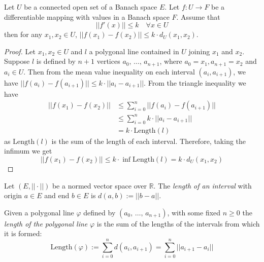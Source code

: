 \begin{theorem}
    \label{thm:mean_value_theorem_in_connected_open_set}
    \leanok
    Let $U$ be a connected open set of a Banach space $E$.
    Let $f: U \rightarrow F$ be a differentiable mapping with values in a Banach space $F$.
    Assume that
    \[
        ||f'(x)|| \leq k \quad \forall x \in U
    \]
    then for any $x_1,x_2 \in U$, $||f(x_1)-f(x_2)|| \leq k \cdot d_U(x_1,x_2)$.
\end{theorem}
\begin{proof}
    \leanok
    Let $x_1,x_2 \in U$ and $l$ a polygonal line contained in $U$ joining $x_1$ and $x_2$.
    Suppose $l$ is defined by $n + 1$ vertices $a_0,\, \dots,\, a_{n+1}$,
    where $a_0=x_1, a_{n+1} = x_2$ and $a_i \in U$.
    Then from the mean value inequality on each interval $(a_i, a_{i+1})$, we have $||f(a_i)-f(a_{i+1})|| \leq k \cdot ||a_i-a_{i+1}||$.
    From the triangle inequality we have
    \begin{align*}
        ||f(x_1)-f(x_2)|| &\leq \sum_{i=0}^{n} ||f(a_i)-f(a_{i+1})|| \\
        &\leq \sum_{i=0}^{n} k \cdot ||a_i-a_{i+1}||\\
        &= k \cdot \text{Length}(l)
    \end{align*}
    as $\text{Length}(l)$ is the sum of the length of each interval.
    Therefore, taking the infimum we get
    \[
        ||f(x_1)-f(x_2)|| \leq k \cdot \inf{\text{Length}(l)} = k\cdot d_U(x_1,x_2)
    \]
\end{proof}

\begin{definition}
    \label{def:intervalLength}
    \leanok
    Let $(E, ||\cdot||)$ be a normed vector space over $\mathbb{R}$.
    The \emph{length of an interval} with origin $a \in E$ and end $b \in E$ is $d(a,b) := ||b - a||$.
\end{definition}

\begin{definition}
    \label{def:polygonalLineLength}
    \leanok
    Given a polygonal line $\varphi$ defined by $(a_0,\, \dots,\, a_{n+1})$, with some fixed $n \geq 0$
    the \emph{length of the polygonal line} $\varphi$ is the sum of the lengths of the intervals from which it is formed:
    \[
        \text{Length}(\varphi) := \sum_{i=0}^{n} d(a_i, a_{i+1}) = \sum_{i=0}^{n} || a_{i+1} - a_i ||
    \]
\end{definition}

